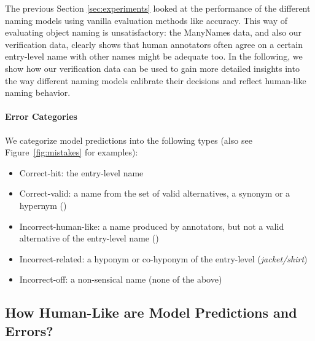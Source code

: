 
The previous Section \ref{sec:experiments} looked at the performance of the different naming models using vanilla evaluation methods like accuracy.
This way of evaluating object naming is unsatisfactory: the ManyNames data, and also our verification data, clearly shows that human annotators often agree on a certain entry-level name with other names might be adequate too.
In the following, we show how our verification data can be used to gain more detailed insights into the way different naming models calibrate their decisions and reflect human-like naming behavior.

\paragraph{Error Categories} We categorize model predictions into the following types (also see Figure~\ref{fig:mistakes} for examples):

\begin{itemize}
\item Correct-hit: the entry-level name 
\item Correct-valid: a name from the set of valid alternatives, a synonym or a hypernym () 
\item Incorrect-human-like: a name produced by annotators, but not a valid alternative of the entry-level name  () 
\item Incorrect-related: a hyponym or co-hyponym of the entry-level (\textit{jacket/shirt})
\item Incorrect-off: a non-sensical name (none of the above)
\end{itemize}

\subsection{How Human-Like are Model Predictions and Errors?}

